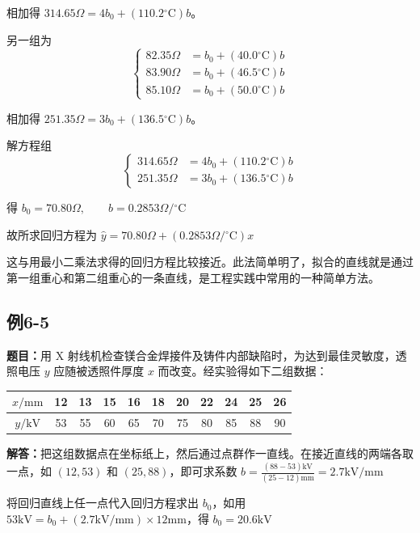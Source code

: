 \documentclass[UTF8,zihao=-4]{ctexart}
\newcommand{\problem}[1]{\subsection*{#1}}
\newcommand{\timu}{\noindent\textbf{题目：}}
\newcommand{\jieda}{\noindent\textbf{解答：}}
\begin{document}
相加得 $314.65\Omega=4b_0+(110.2{}^\circ\mathrm{C})b$。

另一组为
\begin{equation*}
\left\{
\begin{aligned}
    82.35\Omega&=b_0+(40.0{}^\circ\mathrm{C})b\\
    83.90\Omega&=b_0+(46.5{}^\circ\mathrm{C})b\\
    85.10\Omega&=b_0+(50.0{}^\circ\mathrm{C})b
\end{aligned}
\right.
\end{equation*}

相加得 $251.35\Omega=3b_0+(136.5{}^\circ\mathrm{C})b$。

解方程组
\begin{equation*}
\left\{
\begin{aligned}
    314.65\Omega&=4b_0+(110.2{}^\circ\mathrm{C})b\\
    251.35\Omega&=3b_0+(136.5{}^\circ\mathrm{C})b
\end{aligned}
\right.
\end{equation*}

得 $b_0=70.80\Omega, \qquad b=0.2853\Omega/{}^\circ\mathrm{C}$

故所求回归方程为 $\hat{y} = 70.80\Omega + (0.2853\Omega/{}^\circ\mathrm{C})x$

这与用最小二乘法求得的回归方程比较接近。此法简单明了，拟合的直线就是通过第一组重心和第二组重心的一条直线，是工程实践中常用的一种简单方法。

\problem{例6-5}

\timu 用 X 射线机检查镁合金焊接件及铸件内部缺陷时，为达到最佳灵敏度，透照电压 $y$ 应随被透照件厚度 $x$ 而改变。经实验得如下二组数据：

\begin{center}
\small
\setlength{\tabcolsep}{5pt}
\begin{tabular}{c|cccccccccc}
\toprule
$x/\mathrm{mm}$ & 12 & 13 & 15 & 16 & 18 & 20 & 22 & 24 & 25 & 26\\
\midrule
$y/\mathrm{kV}$ & 53 & 55 & 60 & 65 & 70 & 75 & 80 & 85 & 88 & 90\\
\bottomrule
\end{tabular}
\end{center}

\jieda 把这组数据点在坐标纸上，然后通过点群作一直线。在接近直线的两端各取一点，如 $(12,53)$ 和 $(25,88)$，即可求系数 $b = \frac{(88-53)\mathrm{kV}}{(25-12)\mathrm{mm}} = 2.7\mathrm{kV}/\mathrm{mm}$

将回归直线上任一点代入回归方程求出 $b_0$，如用 $53\mathrm{kV}=b_0+(2.7\mathrm{kV}/\mathrm{mm})\times12\mathrm{mm}$，得 $b_0=20.6\mathrm{kV}$
\end{document}
